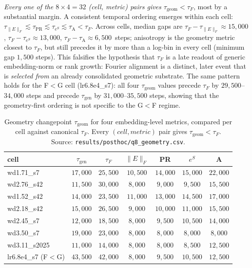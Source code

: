 \documentclass{article}
\newcommand{\taug}{\tau_{\mathrm{gen}}}
\newcommand{\tauf}{\tau_{F}}
\begin{document}
\emph{Every one of the $8\times4=32$ (cell, metric) pairs gives
$\tau_{\mathrm{geom}}<\tauf$}, most by a substantial margin.
A consistent temporal ordering emerges within each cell:
$\tau_{\|E\|_F}\!\lesssim\!\tau_{\mathrm{PR}}\!\lesssim\!
\tau_{e^S}\!\lesssim\!\tau_{\mathrm{A}}<\tauf$.
Across cells, median gaps are
$\tauf{-}\tau_{\|E\|_F}\approx 15{,}000$,
$\tauf{-}\tau_{e^S}\approx 13{,}000$,
$\tauf{-}\tau_{\mathrm{A}}\approx 6{,}500$~steps; anisotropy is
the geometry metric closest to $\tauf$, but still precedes it by
more than a log-bin in every cell (minimum gap $1{,}500$ steps).
This falsifies the hypothesis that $\tauf$ is a late readout of
generic embedding-norm or rank growth: Fourier alignment is a
distinct, later event that is \emph{selected from} an already
consolidated geometric substrate.
The same pattern holds for the F$<$G cell (lr6.8e4\_s7): all four
$\tau_{\mathrm{geom}}$ values precede $\tauf$ by
$29{,}500$--$34{,}000$ steps and precede $\taug$ by
$31{,}000$--$35{,}500$ steps, showing that the geometry-first
ordering is not specific to the G$<$F regime.
\begin{table}[tbp]
  \centering
  \caption{Geometry changepoint $\tau_{\mathrm{geom}}$ for
    four embedding-level metrics, compared per cell against
    canonical $\tauf$.
    Every $(cell,metric)$ pair gives $\tau_{\mathrm{geom}}<\tauf$.
    Source: \texttt{results/posthoc/q8\_geometry.csv}.}
  \label{tab:q8_geometry}
  \small
  \begin{tabular}{lcccccc}
    \toprule
    cell & $\taug$ & $\tauf$ & $\|E\|_F$ & PR & $e^S$ & A \\
    \midrule
    wd1.71\_s7    & $17{,}000$ & $25{,}500$ & $10{,}500$ & $14{,}000$ & $15{,}000$ & $22{,}000$ \\
    wd2.76\_s42   & $11{,}500$ & $30{,}000$ & $8{,}000$  & $9{,}000$  & $9{,}500$  & $15{,}500$ \\
    wd1.52\_s42   & $14{,}000$ & $23{,}500$ & $11{,}000$ & $13{,}000$ & $14{,}500$ & $17{,}000$ \\
    wd2.18\_s42   & $15{,}000$ & $26{,}500$ & $9{,}000$  & $10{,}000$ & $11{,}000$ & $15{,}500$ \\
    wd2.45\_s7    & $12{,}000$ & $18{,}500$ & $8{,}000$  & $9{,}500$  & $10{,}500$ & $14{,}000$ \\
    wd3.50\_s7    & $19{,}000$ & $23{,}000$ & $8{,}000$  & $8{,}000$  & $8{,}000$  & $8{,}000$  \\
    wd3.11\_s2025 & $11{,}000$ & $14{,}000$ & $8{,}000$  & $8{,}000$  & $8{,}500$  & $12{,}500$ \\
    lr6.8e4\_s7 (F$<$G) & $43{,}500$ & $42{,}000$ & $8{,}000$ & $9{,}500$ & $10{,}500$ & $12{,}500$ \\
    \bottomrule
  \end{tabular}
\end{table}
\end{document}
